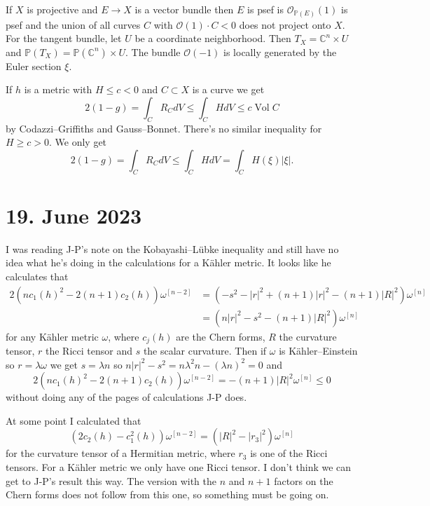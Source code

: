 \documentclass[11pt]{article}
\theoremstyle{definition}
\newcommand{\kk}[1]{\mathbb{#1}}
\newcommand{\cc}[1]{\mathcal{#1}}
\def\^#1{^{[#1]}}
\DeclareMathOperator{\Vol}{Vol}
\begin{document}
If $X$ is projective and $E \to X$ is a vector bundle then $E$ is psef
is $\cc O_{\kk P(E)}(1)$ is psef and the union of all curves $C$
with $\cc O(1) \cdot C < 0$ does not project onto $X$.
For the tangent bundle, let $U$ be a coordinate neighborhood.
Then $T_X = \kk C^n \times U$ and $\kk P(T_X) = \kk P(\kk C^n) \times U$.
The bundle $\cc O(-1)$ is locally generated by the Euler section $\xi$.

If $h$ is a metric with $H \leq c < 0$ and $C \subset X$ is a curve we get
$$
2(1-g)
= \int_C R_{C} dV
\leq \int_C H dV
\leq c \Vol C
$$
by Codazzi--Griffiths and Gauss--Bonnet.
There's no similar inequality for $H \geq c > 0$.
We only get
$$
2(1-g)
= \int_C R_C dV
\leq \int_C H dV
= \int_C H(\xi) |\xi|.
$$




\section{19. June 2023}

I was reading J-P's note on the Kobayashi--L\"ubke inequality and still have no
idea what he's doing in the calculations for a K\"ahler metric.
It looks like he calculates that
\begin{align*}
2(nc_1(h)^2 - 2(n{+}1) c_2(h)) \omega\^{n-2}
&= (-s^2 -|r|^2 + (n{+}1)|r|^2 - (n{+}1)|R|^2) \omega\^n
\\
&= (n|r|^2 - s^2 - (n+1)|R|^2) \omega\^n
\end{align*}
for any K\"ahler metric $\omega$, where $c_j(h)$ are the Chern forms,
$R$ the curvature tensor, $r$ the Ricci tensor and $s$ the scalar curvature.
Then if $\omega$ is K\"ahler--Einstein so $r = \lambda \omega$ we get $s =
\lambda n$ so $n |r|^2 - s^2 = n \lambda^2 n - (\lambda n)^2 = 0$ and
$$
2(nc_1(h)^2 - 2(n{+}1) c_2(h)) \omega\^{n-2}
= -(n+1)|R|^2 \omega\^n \leq 0
$$
without doing any of the pages of calculations J-P does.

At some point I calculated that
$$
(2c_2(h) -c_1^2(h)) \omega\^{n-2}
= (|R|^2 - |r_3|^2) \omega\^n
$$
for the curvature tensor of a Hermitian metric, where $r_3$ is one of the Ricci
tensors. For a K\"ahler metric we only have one Ricci tensor.
I don't think we can get to J-P's result this way.
The version with the $n$ and $n+1$ factors on the Chern forms does not follow
from this one, so something must be going on.

\def\fip{\frac{i}{2\pi}}
\def\tip{\tfrac{i}{2\pi}}
\end{document}
